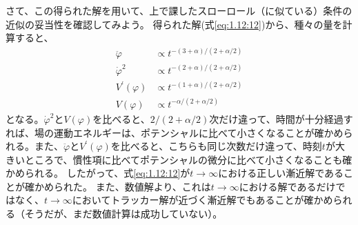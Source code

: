 \documentclass[11pt]{ltjsarticle}
\theoremstyle{plain}
\theoremstyle{break}
\begin{document}
さて、この得られた解を用いて、上で課したスローロール（に似ている）条件の近似の妥当性を確認してみよう。
得られた解(式\eqref{eq:1.12:12})から、種々の量を計算すると、
\begin{align}
  \ddot{\varphi} & \propto t^{-(3+\alpha) /(2+\alpha / 2)} \\
  \dot{\varphi}^{2} & \propto t^{-(2+\alpha) /(2+\alpha / 2)} \\
  V^{\prime}(\varphi) &\propto t^{-(1+\alpha) /(2+\alpha / 2)} \\
  V(\varphi) &\propto t^{-\alpha /(2+\alpha / 2)}
\end{align}%
となる。$\dot{\varphi}^{2}$と$V(\varphi)$を比べると、$2/(2+\alpha/2)$次だけ違って、時間が十分経過すれば、場の運動エネルギーは、ポテンシャルに比べて小さくなることが確かめられる。また、$\ddot{\varphi} $と$V^{\prime}(\varphi) $を比べると、こちらも同じ次数だけ違って、時刻$t$が大きいところで、慣性項に比べてポテンシャルの微分に比べて小さくなることも確かめられる。
したがって、式\eqref{eq:1.12:12}が$t\to \infty$における正しい漸近解であることが確かめられた。
また、数値解より、これは$t \to \infty$における解であるだけではなく、$t \to \infty$においてトラッカー解が近づく漸近解でもあることが確かめられる（そうだが、まだ数値計算は成功していない）。
\end{document}
